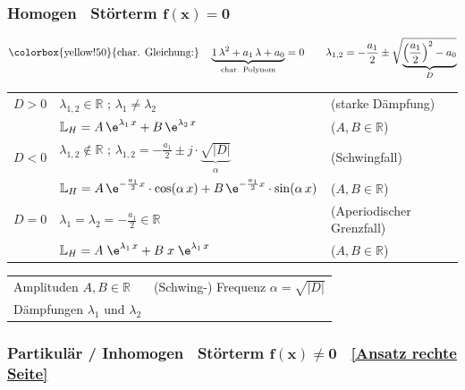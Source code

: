 \subsubsection{Homogen \textrightarrow\ Störterm $\bm{f(x) = 0}$}

\vspace{-0.3cm}

$$ \text{\colorbox{yellow!50}{char. Gleichung:}} \quad \underbrace{1 \, \lambda^2 + a_1 \, \lambda + a_0}_{\text{char. Polynom}} = 0 \qquad
\lambda_{1,2} = - \frac{a_1}{2} \pm \sqrt{\vphantom{\left(\frac{a_1}{2}\right)^2} 
\smash[b]{\underbrace{\left(\frac{a_1}{2}\right)^2 - a_0}_D}} \vphantom{\underbrace{\left(\frac{a_1}{2}\right)^2 - a_0}_D} $$

\setlength{\tabcolsep}{4pt}
\begin{tabular}{lll}
    $D > 0$ & $\lambda_{1,2} \in \mathbb{R}$ ; $\lambda_1 \neq \lambda_2$ & (starke Dämpfung)                                                                      \\ \medskip
            & $\mathbb{L}_H = A \, \e^{\lambda_1 \, x} + B \, \e^{\lambda_2 \, x}$ & ($A, B \in \mathbb{R}$)                                                        \\ 
    $D < 0$ & $\lambda_{1,2} \notin \mathbb{R}$ ; $\lambda_{1,2} = - \frac{a_1}{2} \pm j \cdot \underbrace{\sqrt{\vert D \vert}}_{\substack{\alpha}}$ & (Schwingfall)    \\ \medskip
            & $\mathbb{L}_H = A \, \e^{- \frac{a_1}{2} x} \cdot \cos(\alpha \, x) + B \, \e^{- \frac{a_1}{2} x} \cdot \sin(\alpha \, x)$ & ($A, B \in \mathbb{R}$)  \\
    $D = 0$ & $\lambda_1 = \lambda_2 = - \frac{a_1}{2} \in \mathbb{R}$ & (Aperiodischer Grenzfall)                                                                 \\
            & $\mathbb{L}_H = A \; \e^{\lambda_1 \, x} + B \; x \; \e^{\lambda_1 \, x}$ & ($A, B \in \mathbb{R}$)\\
\end{tabular}
\setlength{\tabcolsep}{6pt}

\medskip

\begin{tabular}{ll}
    Amplituden $A, B \in \mathbb{R}$        & (Schwing-) Frequenz $\alpha = \sqrt{\vert D \vert}$   \\
    Dämpfungen $\lambda_1$ und $\lambda_2$ 
\end{tabular}


\subsubsection{Partikulär / Inhomogen \textrightarrow\ Störterm $\bm{f(x) \neq 0}$ \textrightarrow\ \ref{Ansatz rechte Seite}}
\label{chap:inhomogen_n2}

